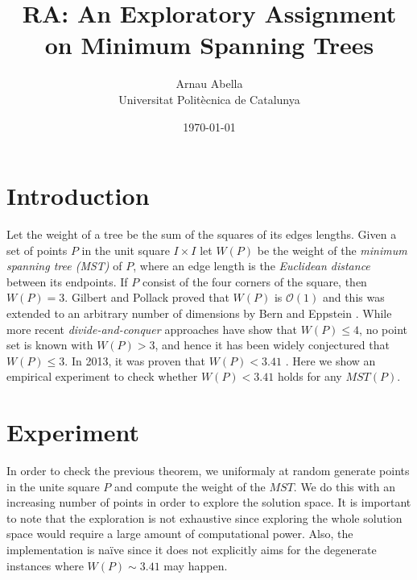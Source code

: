\documentclass[12pt, a4paper]{article}
\title{%
  \vspace{-10ex}
  RA: An Exploratory Assignment on Minimum Spanning Trees
}
\author{%
  Arnau Abella \\
  \large{Universitat Polit\`ecnica de Catalunya}
}
\date{\today}
\begin{document}
\maketitle


\vspace{5ex}


\section{Introduction}\label{sec:1}

Let the weight of a tree be the sum of the squares of its edges lengths. Given a set of points $P$ in the unit square $I \times I$ let $W(P)$ be the weight of the \textit{minimum spanning tree (MST)} of $P$, where an edge length is the \textit{Euclidean distance} between its endpoints. If $P$ consist of the four corners of the square, then $W(P) = 3$. Gilbert and Pollack \cite{gil68} proved that $W(P)$ is $\mathcal{O}(1)$ and this was extended to an arbitrary number of dimensions by Bern and Eppstein \cite{bern93}. While more recent \textit{divide-and-conquer} approaches have show that $W(P) \leq 4$, no point set is known with $W(P) > 3$, and hence it has been widely conjectured that $W(P) \leq 3$. In 2013, it was proven that $W(P) < 3.41$ \cite{aichholzer2013sum}. Here we show an empirical experiment to check whether $W(P) < 3.41$ holds for any $MST(P)$.

\section{Experiment}\label{sec:2}

In order to check the previous theorem, we uniformaly at random generate points in the unite square $P$ and compute the weight of the $MST$. We do this with an increasing number of points in order to explore the solution space. It is important to note that the exploration is not exhaustive since exploring the whole solution space would require a large amount of computational power. Also, the implementation is na\"ive since it does not explicitly aims for the degenerate instances where $W(P) \sim 3.41$ may happen.
\end{document}
